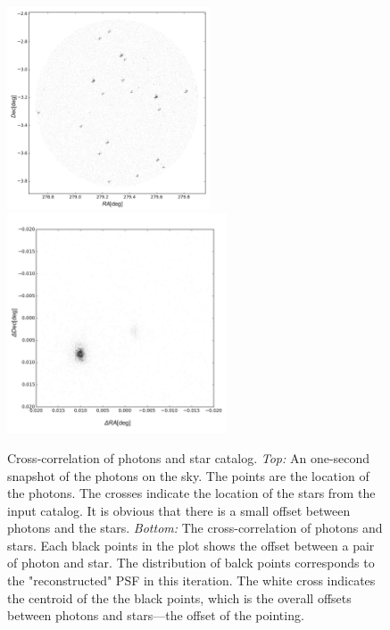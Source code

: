\documentclass[12pt, preprint]{aastex61}
\begin{document}
\begin{figure}[p]
\begin{center}
\includegraphics[width=0.535\textwidth]{figures/photons600-new}
\includegraphics[width=0.58\textwidth]{figures/co600-new}
\end{center}
\caption{%
  \label{slice}
  Cross-correlation of photons and star catalog.
  \emph{Top:}  An one-second snapshot of the photons on the sky. The points are the location of the photons. The crosses indicate the location of the stars from the input catalog. It is obvious that there is a small offset between photons and the stars.
  \emph{Bottom:} The cross-correlation of photons and stars. 
  Each black points in the plot shows the offset between a pair of photon and star.
  The distribution of balck points corresponds to the "reconstructed" PSF in this iteration. 
  The white cross indicates the centroid of the the black points, which is the overall offsets between photons and stars---the offset of the pointing.
  }
\end{figure}
\end{document}
